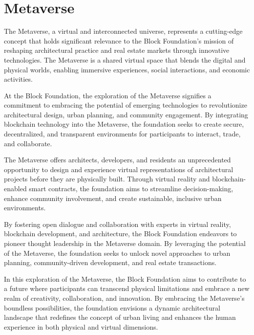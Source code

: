 \newpage
\section{Metaverse}


The Metaverse, a virtual and interconnected universe, represents a cutting-edge concept that holds significant relevance to the Block Foundation's mission of reshaping architectural practice and real estate markets through innovative technologies. The Metaverse is a shared virtual space that blends the digital and physical worlds, enabling immersive experiences, social interactions, and economic activities.

At the Block Foundation, the exploration of the Metaverse signifies a commitment to embracing the potential of emerging technologies to revolutionize architectural design, urban planning, and community engagement. By integrating blockchain technology into the Metaverse, the foundation seeks to create secure, decentralized, and transparent environments for participants to interact, trade, and collaborate.

The Metaverse offers architects, developers, and residents an unprecedented opportunity to design and experience virtual representations of architectural projects before they are physically built. Through virtual reality and blockchain-enabled smart contracts, the foundation aims to streamline decision-making, enhance community involvement, and create sustainable, inclusive urban environments.

By fostering open dialogue and collaboration with experts in virtual reality, blockchain development, and architecture, the Block Foundation endeavors to pioneer thought leadership in the Metaverse domain. By leveraging the potential of the Metaverse, the foundation seeks to unlock novel approaches to urban planning, community-driven development, and real estate transactions.

In this exploration of the Metaverse, the Block Foundation aims to contribute to a future where participants can transcend physical limitations and embrace a new realm of creativity, collaboration, and innovation. By embracing the Metaverse's boundless possibilities, the foundation envisions a dynamic architectural landscape that redefines the concept of urban living and enhances the human experience in both physical and virtual dimensions.